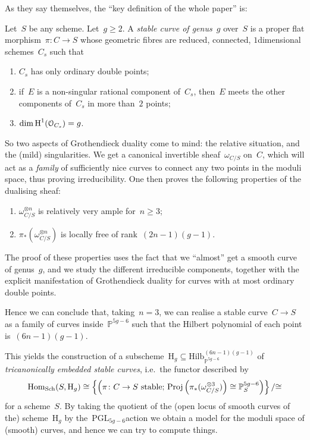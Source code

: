 As they say themselves, the ``key definition of the whole paper'' is:
\begin{definition}
  Let~$S$ be any scheme. Let~$g\geq 2$. A \emph{stable curve of genus~$g$} over~$S$ is a proper flat morphism~$\pi\colon C\to S$ whose geometric fibres are reduced, connected, $1$\dash dimensional schemes~$C_s$ such that
  \begin{enumerate}
    \item $C_s$ has only ordinary double points;
    \item if~$E$ is a non-singular rational component of~$C_s$, then~$E$ meets the other components of~$C_s$ in more than~$2$ points;
    \item $\dim\operatorname{H}^1(\mathcal{O}_{C_s})=g$.
  \end{enumerate}
\end{definition}
So two aspects of Grothendieck duality come to mind: the relative situation, and the (mild) singularities. We get a canonical invertible sheaf~$\omega_{C/S}$ on~$C$, which will act as a \emph{family} of sufficiently nice curves to connect any two points in the moduli space, thus proving irreducibility. One then proves the following properties of the dualising sheaf:
\begin{enumerate}
  \item $\omega_{C/S}^{\otimes n}$ is relatively very ample for~$n\geq 3$;
  \item $\pi_*(\omega_{C/S}^{\otimes n})$ is locally free of rank~$(2n-1)(g-1)$.
\end{enumerate}
The proof of these properties uses the fact that we ``almost'' get a smooth curve of genus~$g$, and we study the different irreducible components, together with the explicit manifestation of Grothendieck duality for curves with at most ordinary double points.

Hence we can conclude that, taking~$n=3$, we can realise a stable curve~$C\to S$ as a family of curves inside~$\mathbb{P}^{5g-6}$ such that the Hilbert polynomial of each point is~$(6n-1)(g-1)$.

This yields the construction of a subscheme~$\mathrm{H}_g\subseteq\mathrm{Hilb}_{\mathbb{P}^{5g-6}}^{(6n-1)(g-1)}$ of \emph{tricanonically embedded stable curves}, i.e.\ the functor described by
\begin{equation}
  \operatorname{Hom}_{\mathrm{Sch}}(S,\mathrm{H}_g)\cong\left\{ \left( \text{$\pi\colon C\to S$ stable; $\operatorname{Proj}\left( \pi_*(\omega_{C/S}^{\otimes 3}) \right)\cong\mathbb{P}_S^{5g-6}$} \right) \right\}/{\cong}
\end{equation}
for a scheme~$S$. By taking the quotient of the (open locus of smooth curves of the) scheme~$\mathrm{H}_g$ by the~$\mathrm{PGL}_{5g-6}$\dash action we obtain a model for the moduli space of (smooth) curves, and hence we can try to compute things.

